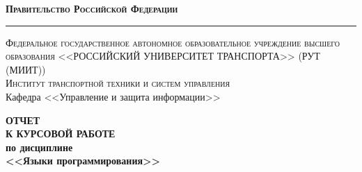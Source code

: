 \documentclass[a4paper,12pt]{article}
\begin{document}
\begin{titlepage}

\begin{center}
{\textsc{\textbf{Правительство Российской Федерации}}}\\
\vspace{0.5cm}
\hrule
\vspace{0.5cm}
{\textsc{Федеральное государственное автономное образовательное учреждение высшего образования <<РОССИЙСКИЙ УНИВЕРСИТЕТ ТРАНСПОРТА>> (РУТ (МИИТ))}}\\
\vspace{1cm}
{\textsc{Институт транспортной техники и систем управления}}\\
\vspace{1cm}
Кафедра <<Управление и защита информации>>
\end{center}

\vspace{\fill}

\begin{center}
{\Large{\textbf{ОТЧЕТ \\ К КУРСОВОЙ РАБОТЕ}}} \\
\vspace{1em}
{\textbf{по дисциплине}} \\
\vspace{1em}
{\large{\textbf{<<Языки программирования>>}}}
\end{center}

\vspace{\fill}


\begin{flushright}
  \begin{minipage}[center]{15cm}


\end{minipage}
\end{flushright}
\end{titlepage}
\end{document}

